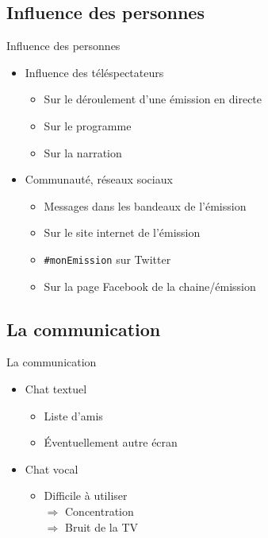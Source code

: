 \documentclass{beamer}
\begin{document}
	\subsection{Influence des personnes}
	\begin{frame}{Influence des personnes}
\begin{itemize}
	\item Influence des téléspectateurs
		\begin{itemize}
			\item Sur le déroulement d'une émission en directe
			\item Sur le programme
			\item Sur la narration
		\end{itemize}
	\pause
		\vfill
	\item Communauté, réseaux sociaux
		\begin{itemize}
			\item Messages dans les bandeaux de l'émission
			\item Sur le site internet de l'émission
			\item \texttt{\#monEmission} sur Twitter
			\item Sur la page Facebook de la chaine/émission
		\end{itemize}
		\vfill
\end{itemize}
	\end{frame}
	\subsection{La communication}
	\begin{frame}{La communication}
\begin{itemize}
	\item Chat textuel
		\begin{itemize}
			\item Liste d'amis
			\item Éventuellement autre écran
		\end{itemize}
		\vfill
		\pause
	\item Chat vocal
		\begin{itemize}
			\item Difficile à utiliser \\
				$\Rightarrow$ Concentration\\
				$\Rightarrow$ Bruit de la TV
		\end{itemize}
		\vfill
\end{itemize}
	\end{frame}
\end{document}
